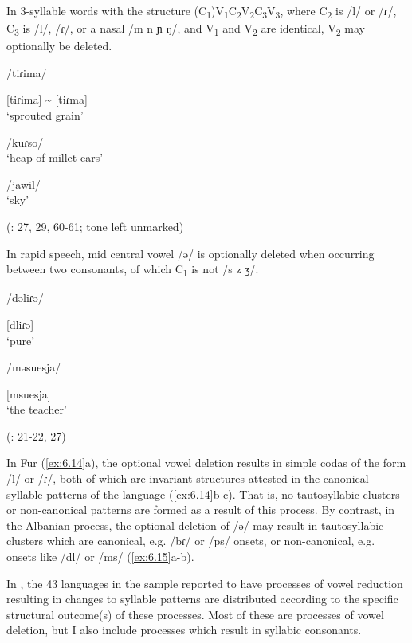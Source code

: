 \ea\label{ex:6.14}

  In 3-syllable words with the structure (C\textsubscript{1})V\textsubscript{1}C\textsubscript{2}V\textsubscript{2}C\textsubscript{3}V\textsubscript{3}, where C\textsubscript{2} is /l/ or /ɾ/, C\textsubscript{3} is /l/, /ɾ/, or a nasal /m n ɲ ŋ/, and V\textsubscript{1} and V\textsubscript{2} are identical, V\textsubscript{2} may optionally be deleted.

\ea  /tiɾima/

[tiɾima] {\textasciitilde} [tiɾma]\\
\glt ‘sprouted grain’

\ex  /kuɾso/\\
\glt ‘heap of millet ears’

\ex  /jawil/\\
\glt ‘sky’

(\citealt{Jakobi1990}: 27, 29, 60-61; tone left unmarked)
\z
\z

\ea\label{ex:6.15}

  In rapid speech, mid central vowel /ə/ is optionally deleted when occurring between two consonants, of which C\textsubscript{1} is not /s z ʒ/.

\ea  /dəliɾə/

[dliɾə]\\
\glt ‘pure’

\ex  /məsuesja/

[msuesja]\\
\glt ‘the teacher’

(\citealt{Klippenstein2010}: 21-22, 27)
\z
\z

  In Fur (\ref{ex:6.14}a), the optional vowel deletion results in simple codas of the form /l/ or /ɾ/, both of which are invariant structures attested in the canonical syllable patterns of the language (\ref{ex:6.14}b-c). That is, no tautosyllabic clusters or non-canonical patterns are formed as a result of this process. By contrast, in the Albanian process, the optional deletion of /ə/ may result in tautosyllabic clusters which are canonical, e.g. /bɾ/ or /ps/ onsets, or non-canonical, e.g. onsets like /dl/ or /ms/ (\ref{ex:6.15}a-b).

  In , the 43 languages in the sample reported to have processes of vowel reduction resulting in changes to syllable patterns are distributed according to the specific structural outcome(s) of these processes. Most of these are processes of vowel deletion, but I also include processes which result in syllabic consonants.

